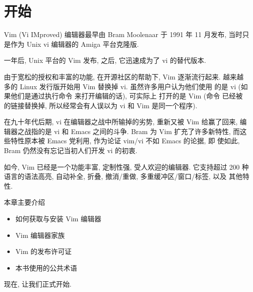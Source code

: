 \chapter{开始}
\label{chap:getting_started_with_vim}

Vim (Vi IMproved) 编辑器最早由 Bram Moolenaar 于 1991 年 11 月发布,
当时只是作为 Unix vi 编辑器的 Amiga 平台克隆版.

一年后, Unix 平台的 Vim 发布, 之后, 它迅速成为了 vi 的替代版本.

由于宽松的授权和丰富的功能, 在开源社区的帮助下, Vim 逐渐流行起来.
越来越多的 Linux 发行版开始用 Vim 替换掉 vi. 虽然许多用户认为他们使用
的是 vi (如果他们是通过执行命令 \vi 来打开编辑的话), 可实际上
打开的是 Vim (命令 \vi 已经被 \vim 的链接替换掉, 所以经常会有人误以为
vi 和 Vim 是同一个程序).

在九十年代后期, vi 在编辑器之战中所输掉的劣势, 重新又被 Vim 给赢了回来,
编辑器之战指的是 vi 和 Emacs 之间的斗争. Bram 为 Vim 扩充了许多新特性, 
而这些特性原本被  Emacs 党利用, 作为论证 vim/vi 不如 Emacs 的论据, 即
使如此, Bram 仍然没有忘记当初人们开发 vi 的初衷.

如今, Vim 已经是一个功能丰富, 定制性强, 受人欢迎的编辑器. 它支持超过 200 
种语言的语法高亮, 自动补全, 折叠, 撤消/重做, 多重缓冲区/窗口/标签, 以及
其他特性.

本章主要介绍
\begin{itemize}
    \item 如何获取与安装 Vim 编辑器
    \item Vim 编辑器家族
    \item Vim 的发布许可证 
    \item 本书使用的公共术语
\end{itemize}
现在, 让我们正式开始.

